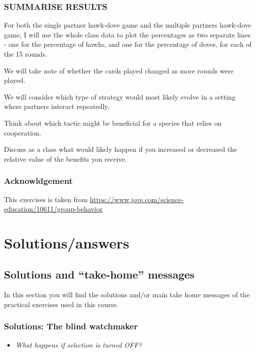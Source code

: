 \documentclass[
  a4paper]{book}
\providecommand{\tightlist}{%
  \setlength{\itemsep}{0pt}\setlength{\parskip}{0pt}}
\begin{document}
\section{SUMMARISE RESULTS}\label{summarise-results}

For both the single partner hawk-dove game and the multiple partners hawk-dove game, I will use the whole class data to plot the percentages as two separate lines - one for the percentage of hawks, and one for the percentage of doves, for each of the 15 rounds.

We will take note of whether the cards played changed as more rounds were played.

We will consider which type of strategy would most likely evolve in a setting where partners interact repeatedly.

Think about which tactic might be beneficial for a species that relies on cooperation.

Discuss as a class what would likely happen if you increased or decreased the relative value of the benefits you receive.

\section{Acknowldgement}\label{acknowldgement}

This exercises is taken from \url{https://www.jove.com/science-education/10611/group-behavior}

\part{Solutions/answers}\label{part-solutionsanswers}

\chapter{Solutions and ``take-home'' messages}\label{solutions-and-take-home-messages}

In this section you will find the solutions and/or main take home messages of the practical exercises used in this course.

\section{Solutions: The blind watchmaker}\label{solutions-the-blind-watchmaker}

\begin{itemize}
\tightlist
\item
  \emph{What happens if selection is turned OFF?}
\end{itemize}
\end{document}
